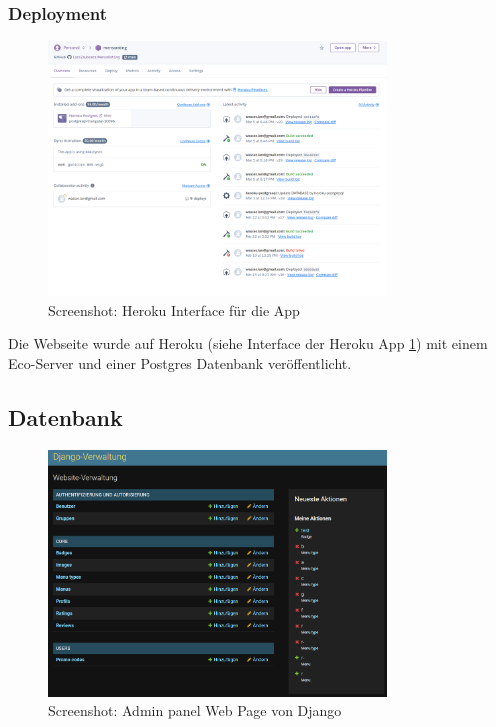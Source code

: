 \newpage

\subsubsection*{Deployment}

\begin{figure}[ht]
    \centering
    \includegraphics[width=0.8\textwidth]{images/Heroku.png}
    \caption{Screenshot: Heroku Interface für die App}
    \label{fig:r-deployment}
\end{figure}

Die Webseite wurde auf Heroku (siehe Interface der Heroku App
\ref{fig:r-deployment}) mit einem Eco-Server und einer Postgres Datenbank
veröffentlicht.

\newpage

\subsection{Datenbank}

\begin{figure}[ht]
    \centering
    \includegraphics[width=0.8\textwidth]{images/Resultat-Adminpanel.png}
    \caption{Screenshot: Admin panel Web Page von Django}
    \label{fig:r-adminpanel}
\end{figure}

